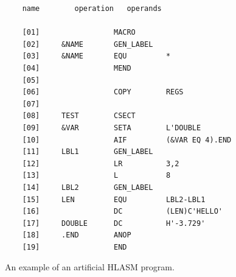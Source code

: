 \begin{listing}[p]
	\begin{verbatim}
	name        operation   operands
	
	[01]                 MACRO                   
	[02]     &NAME       GEN_LABEL
	[03]     &NAME       EQU         *
	[04]                 MEND
	[05]             
	[06]                 COPY        REGS
	[07]             
	[08]     TEST        CSECT
	[09]     &VAR        SETA        L'DOUBLE
	[10]                 AIF         (&VAR EQ 4).END
	[11]     LBL1        GEN_LABEL
	[12]                 LR          3,2
	[13]                 L           8
	[14]     LBL2        GEN_LABEL
	[15]     LEN         EQU         LBL2-LBL1
	[16]                 DC          (LEN)C'HELLO'
	[17]     DOUBLE      DC          H'-3.729'
	[18]     .END        ANOP
	[19]                 END
	\end{verbatim} 
	\caption{An example of an artificial HLASM program.}
	\label{lst:example}
\end{listing}
